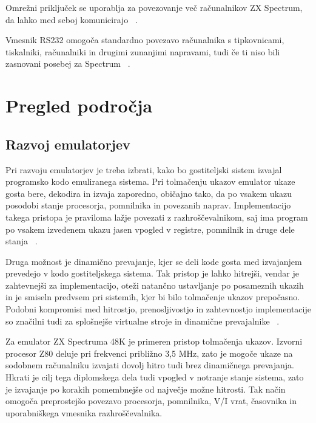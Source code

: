 \documentclass[a4paper, 12pt, openright]{book}
\begin{document}
    Omrežni priključek se uporablja za povezovanje več računalnikov ZX Spectrum,
    da lahko med seboj komunicirajo ~\cite{zxspectrumbasicprogramming}.

    Vmesnik RS232 omogoča standardno povezavo računalnika s tipkovnicami,
    tiskalniki, računalniki in drugimi zunanjimi napravami, tudi če ti niso bili
    zasnovani posebej za Spectrum ~\cite{zxspectrumbasicprogramming}.

    \chapter{Pregled področja}
    \label{sorodnadela}

    \section{Razvoj emulatorjev}

    Pri razvoju emulatorjev je treba izbrati, kako bo gostiteljski sistem izvajal
    programsko kodo emuliranega sistema. Pri tolmačenju ukazov emulator ukaze
    gosta bere, dekodira in izvaja zaporedno, običajno tako, da po vsakem ukazu posodobi
    stanje procesorja, pomnilnika in povezanih naprav. Implementacijo takega pristopa
    je praviloma lažje povezati z razhroščevalnikom, saj ima program po vsakem
    izvedenem ukazu jasen vpogled v registre, pomnilnik in druge dele stanja ~\cite{bellardqemu,
    smithnairvirtualmachines}.

    Druga možnost je dinamično prevajanje, kjer se deli kode gosta med izvajanjem
    prevedejo v kodo gostiteljskega sistema. Tak pristop je lahko hitrejši, vendar
    je zahtevnejši za implementacijo, oteži natančno ustavljanje po posameznih
    ukazih in je smiseln predvsem pri sistemih, kjer bi bilo tolmačenje ukazov prepočasno.
    Podobni kompromisi med hitrostjo, prenosljivostjo in zahtevnostjo implementacije
    so značilni tudi za splošnejše virtualne stroje in dinamične prevajalnike ~\cite{bellardqemu,
    smithnairvirtualmachines}.

    Za emulator ZX Spectruma 48K je primeren pristop tolmačenja ukazov. Izvorni procesor
    Z80 deluje pri frekvenci približno 3,5 MHz, zato je mogoče ukaze na sodobnem
    računalniku izvajati dovolj hitro tudi brez dinamičnega prevajanja. Hkrati je
    cilj tega diplomskega dela tudi vpogled v notranje stanje sistema, zato je
    izvajanje po korakih pomembnejše od največje možne hitrosti. Tak način omogoča
    preprostejšo povezavo procesorja, pomnilnika, V/I vrat, časovnika in
    uporabniškega vmesnika razhroščevalnika.
\end{document}
